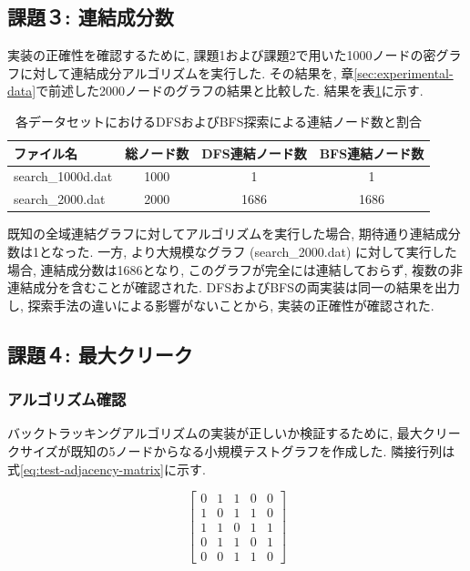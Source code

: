 \documentclass[a4j, 12pt]{jarticle}
\begin{document}
\subsection{課題３: 連結成分数}
実装の正確性を確認するために, 課題1および課題2で用いた1000ノードの密グラフに対して連結成分アルゴリズムを実行した. その結果を, 章\ref{sec:experimental-data}で前述した2000ノードのグラフの結果と比較した. 結果を表\ref{table:connected-components-results}に示す.
\begin{table}[H]
  \centering
  \caption{各データセットにおけるDFSおよびBFS探索による連結ノード数と割合}\label{table:connected-components-results}
  \begin{tabular}{lccc}
  \hline
  ファイル名 & 総ノード数 & DFS連結ノード数 & BFS連結ノード数 \\
  \hline
  search\_1000d.dat & 1000 & 1    & 1 \\
  search\_2000.dat  & 2000 & 1686 & 1686\\
  \hline
  \end{tabular}
\end{table}
既知の全域連結グラフに対してアルゴリズムを実行した場合, 期待通り連結成分数は1となった. 一方, より大規模なグラフ (search\_2000.dat) に対して実行した場合, 連結成分数は1686となり, このグラフが完全には連結しておらず, 複数の非連結成分を含むことが確認された. DFSおよびBFSの両実装は同一の結果を出力し, 探索手法の違いによる影響がないことから, 実装の正確性が確認された.
\subsection{課題４: 最大クリーク}
\subsubsection{アルゴリズム確認}
バックトラッキングアルゴリズムの実装が正しいか検証するために, 最大クリークサイズが既知の5ノードからなる小規模テストグラフを作成した. 隣接行列は式\ref{eq:test-adjacency-matrix}に示す.

\begin{equation}\label{eq:test-adjacency-matrix}
  \begin{bmatrix}
  0 & 1 & 1 & 0 & 0 \\
  1 & 0 & 1 & 1 & 0 \\
  1 & 1 & 0 & 1 & 1 \\
  0 & 1 & 1 & 0 & 1 \\
  0 & 0 & 1 & 1 & 0
  \end{bmatrix}
\end{equation}
\end{document}
